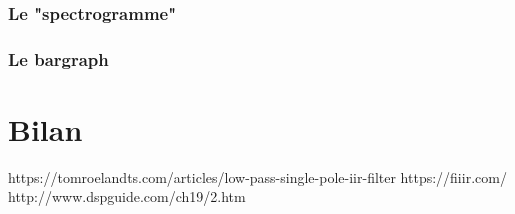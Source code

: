 \documentclass[hidelinks]{article}
\begin{document}
    \section{Le "spectrogramme"}
    \section{Le bargraph}
    \part*{Bilan}
  
\newpage
https://tomroelandts.com/articles/low-pass-single-pole-iir-filter
https://fiiir.com/
http://www.dspguide.com/ch19/2.htm
\end{document}
